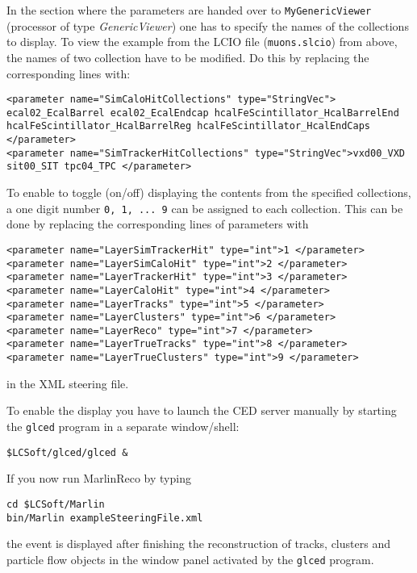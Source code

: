 In the section
where the parameters are handed over to {\tt MyGenericViewer}
(processor of type {\em GenericViewer}) one has to specify the
names of the collections to display. To view the example from the LCIO file
({\tt muons.slcio}) from above, the names of two collection have to be
modified. Do this by replacing the corresponding lines with:

\begin{verbatim}
<parameter name="SimCaloHitCollections" type="StringVec"> ecal02_EcalBarrel ecal02_EcalEndcap hcalFeScintillator_HcalBarrelEnd hcalFeScintillator_HcalBarrelReg hcalFeScintillator_HcalEndCaps </parameter>
<parameter name="SimTrackerHitCollections" type="StringVec">vxd00_VXD sit00_SIT tpc04_TPC </parameter>
\end{verbatim}

To enable to toggle (on/off) displaying the contents from the
specified collections, a one digit number {\tt 0, 1, ... 9} can be assigned
to each collection. This can be done by replacing the corresponding
lines of parameters with

\begin{verbatim}
<parameter name="LayerSimTrackerHit" type="int">1 </parameter>
<parameter name="LayerSimCaloHit" type="int">2 </parameter>
<parameter name="LayerTrackerHit" type="int">3 </parameter>
<parameter name="LayerCaloHit" type="int">4 </parameter>
<parameter name="LayerTracks" type="int">5 </parameter>
<parameter name="LayerClusters" type="int">6 </parameter>
<parameter name="LayerReco" type="int">7 </parameter>
<parameter name="LayerTrueTracks" type="int">8 </parameter>
<parameter name="LayerTrueClusters" type="int">9 </parameter>
\end{verbatim}

in the XML steering file.

To enable the display you have to launch the CED server manually
by starting the {\tt glced} program in a separate window/shell:

\begin{verbatim}
$LCSoft/glced/glced &
\end{verbatim}

If you now run MarlinReco by typing

\begin{verbatim}
cd $LCSoft/Marlin
bin/Marlin exampleSteeringFile.xml
\end{verbatim}

the event is displayed after finishing the reconstruction of
tracks, clusters and particle flow objects in the window panel activated by
the {\tt glced} program.

